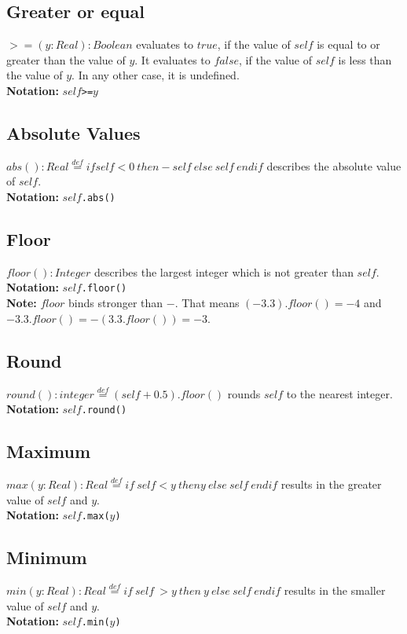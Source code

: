 \subsection{Greater or equal}
$>=(y:\mathit{Real}):\mathit{Boolean}$ evaluates to $\mathit{true}$, if the
value of
  $\mathit{self}$ is equal to or greater than the value of $y$.  It evaluates
  to $\mathit{false}$, if the value of $\mathit{self}$ is less than the value of $y$.
  In any other case, it is undefined.\\
  {\bf Notation:} $\mathit{self}$\verb+>=+$y$
\subsection{Absolute Values}
$\mathit{abs}():\mathit{Real}\stackrel{def}{=}\mathit{if} \mathit{self} < 0~ \mathit{then} -\mathit{self}\
\mathit{else}\ \mathit{self}\ \mathit{endif}$ describes the absolute value of $\mathit{self}$.\\
{\bf Notation:} $\mathit{self}$\verb+.abs()+
\subsection{Floor}
$\mathit{floor}():\mathit{Integer}$ describes the largest integer
which is not
  greater than $\mathit{self}$.\\
  {\bf Notation:} $\mathit{self}$\verb+.floor()+\\
  {\bf Note:} $\mathit{floor}$ binds stronger than $-$. That means
  $(-3.3).floor() = -4$ and $-3.3.floor() = -(3.3.floor()) = -3$.
\subsection{Round}
$\mathit{round}():\mathit{integer}\stackrel{def}{=}(\mathit{self}+0.5).\mathit{floor}()$ rounds
  $\mathit{self}$ to the nearest integer.\\
  {\bf Notation:} $\mathit{self}$\verb+.round()+
\subsection{Maximum}
$\mathit{max}(y:\mathit{Real}):\mathit{Real}\stackrel{def}{=}\mathit{if}\ \mathit{self} < y\ \mathit{then} y\
\mathit{else}\ \mathit{self}\ \mathit{endif}$ results in the greater value of $\mathit{self}$ and $y$.\\
  {\bf Notation:} $\mathit{self}$\verb+.max(+$y$\verb+)+
\subsection{Minimum}
$\mathit{min}(y:\mathit{Real}):\mathit{Real}\stackrel{def}{=}\mathit{if}\ \mathit{self}\ > y\ \mathit{then}\ y\
\mathit{else}\
  \mathit{self}\ \mathit{endif}$ results in the smaller value of $\mathit{self}$ and $y$.\\
  {\bf Notation:} $\mathit{self}$\verb+.min(+$y$\verb+)+
